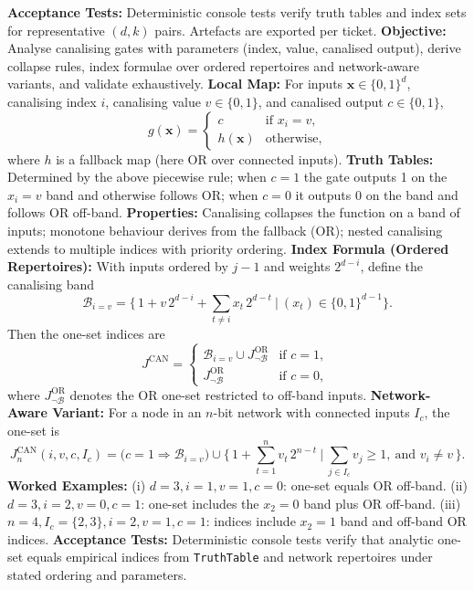\textbf{Acceptance Tests:} Deterministic console tests verify truth tables and index sets for representative \((d,k)\) pairs. Artefacts are exported per ticket.
\textbf{Objective:} Analyse canalising gates with parameters (index, value, canalised output), derive collapse rules, index formulae over ordered repertoires and network-aware variants, and validate exhaustively.
\textbf{Local Map:} For inputs \(\mathbf{x}\in\{0,1\}^d\), canalising index \(i\), canalising value \(v\in\{0,1\}\), and canalised output \(c\in\{0,1\}\),
\[
g(\mathbf{x}) = \begin{cases}
 c & \text{if } x_i = v,\\
 h(\mathbf{x}) & \text{otherwise,}
\end{cases}
\]
where \(h\) is a fallback map (here \(\mathrm{OR}\) over connected inputs).
\textbf{Truth Tables:} Determined by the above piecewise rule; when \(c=1\) the gate outputs 1 on the \(x_i=v\) band and otherwise follows \(\mathrm{OR}\); when \(c=0\) it outputs 0 on the band and follows \(\mathrm{OR}\) off-band.
\textbf{Properties:} Canalising collapses the function on a band of inputs; monotone behaviour derives from the fallback (\(\mathrm{OR}\)); nested canalising extends to multiple indices with priority ordering.
\textbf{Index Formula (Ordered Repertoires):} With inputs ordered by \(j-1\) and weights \(2^{d-i}\), define the canalising band
\[
\mathcal{B}_{i=v} = \Big\{\, 1 + v\,2^{d-i} + \sum_{t\ne i} x_t\,2^{d-t} \ \Big| \ (x_t)\in\{0,1\}^{d-1} \Big\}.
\]
Then the one-set indices are
\[
J^{\mathrm{CAN}} = \begin{cases}
 \mathcal{B}_{i=v} \cup J^{\mathrm{OR}}_{\neg \mathcal{B}} & \text{if } c=1,\\
 J^{\mathrm{OR}}_{\neg \mathcal{B}} & \text{if } c=0,\
\end{cases}
\]
where \(J^{\mathrm{OR}}_{\neg \mathcal{B}}\) denotes the \(\mathrm{OR}\) one-set restricted to off-band inputs.
\textbf{Network-Aware Variant:} For a node in an \(n\)-bit network with connected inputs \(I_c\), the one-set is
\[
J^{\mathrm{CAN}}_{n}(i,v,c,I_c) = \Big( c=1 \Rightarrow \mathcal{B}_{i=v} \Big) \cup \Big\{\, 1 + \sum_{t=1}^{n} v_t\,2^{n-t} \ \Big| \ \sum_{j\in I_c} v_j \ge 1,\ \text{and } v_i \ne v\,\Big\}.
\]
\textbf{Worked Examples:} (i) \(d=3, i=1, v=1, c=0\): one-set equals \(\mathrm{OR}\) off-band. (ii) \(d=3, i=2, v=0, c=1\): one-set includes the \(x_2=0\) band plus \(\mathrm{OR}\) off-band. (iii) \(n=4, I_c=\{2,3\}, i=2, v=1, c=1\): indices include \(x_2=1\) band and off-band \(\mathrm{OR}\) indices.
\textbf{Acceptance Tests:} Deterministic console tests verify that analytic one-set equals empirical indices from \texttt{TruthTable} and network repertoires under stated ordering and parameters.
